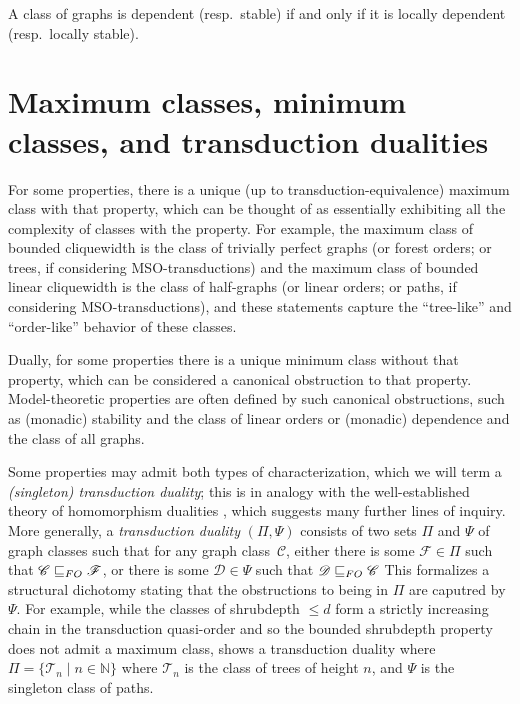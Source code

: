 \documentclass{lmcs}
\newcommand{\Cc}{\mathscr{C}}
\newcommand{\Dd}{\mathscr{D}}
\newcommand{\Ff}{\mathscr{F}}
\newcommand{\N}{\mathbb{N}}
\renewcommand{\FO}{{\rm FO}}
\newcommand{\MSO}{{\rm MSO}}
\theoremstyle{definition}
\begin{document}
\begin{cor}
	A class of graphs is dependent (resp.\ stable) if and only if it is locally dependent (resp.\ locally stable).
\end{cor}


\section{Maximum classes, minimum classes, and transduction dualities}\label{sec:dual}
For some properties, there is a unique (up to transduction-equivalence) maximum class with that property, which can be thought of as essentially exhibiting all the complexity of classes with the property. For example, the maximum class of bounded cliquewidth is the class of trivially perfect graphs (or forest orders; or trees, if considering \MSO-transductions) and the maximum class of bounded linear cliquewidth is the class of half-graphs (or linear orders; or paths, if considering \MSO-transductions), and these statements capture the ``tree-like'' and ``order-like'' behavior of these classes.


Dually, for some properties there is a unique minimum class without that property, which can be considered a canonical obstruction to that property. Model-theoretic properties are often defined by such canonical obstructions, such as (monadic) stability and the class of linear orders or (monadic) dependence and the class of all graphs. 

Some properties may admit both types of characterization, which we will term a \emph{(singleton) transduction duality}; this is in analogy with the well-established theory of homomorphism dualities \cite{nesetril2000duality}, which suggests many further lines of inquiry. More generally, a \emph{transduction duality} $(\Pi, \Psi)$ consists of two sets $\Pi$ and $\Psi$ of graph classes such that for any graph class~$\Cc$, either there is some $\Ff \in \Pi$ such that $\Cc \sqsubseteq_\FO \Ff$, or  there is some $\Dd \in \Psi$ such that $\Dd \sqsubseteq_\FO \Cc$
This formalizes a structural dichotomy stating that the obstructions to being in $\Pi$ are caputred by $\Psi$.  For example, while the classes of shrubdepth $\leq d$ form a strictly increasing chain in the transduction quasi-order \cite[Theorem 4.5]{ganian2019shrub} and so the bounded shrubdepth property does not admit a maximum class, \cite{shrubbery} shows a transduction duality where $\Pi = \{ \mathscr T_n \mid n \in \N\}$ where $\mathscr T_n$ is the class of trees of height $n$, and $\Psi$ is the singleton class of paths.
\end{document}
